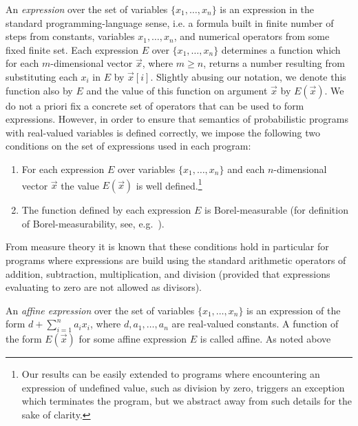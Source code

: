 \smallskip{}
An \emph{expression} over the set of variables $\{x_1,\dots,x_n\}$ 
is an expression in the standard programming-language sense, i.e. a formula 
built in finite number of steps from constants, variables $x_1,\dots,x_n$, and 
numerical operators from some fixed finite set. Each expression $E$ over 
$\{x_1,\dots,x_n\}$ 
determines a function which for each $m$-dimensional vector $\vec{x}$, where 
$m\geq n$,  
returns a number resulting from substituting each $x_i$ in $E$ by $\vec{x}[i]$. 
Slightly abusing our notation, we denote this function also by $E$ and the 
value of this function on argument $\vec{x}$ by $E(\vec{x})$. We do not a priori fix a concrete set of operators that can be used to form expressions. However, in order to ensure that semantics of probabilistic programs with real-valued variables is defined correctly, we impose the following two conditions on the set of expressions used in each program:
\begin{enumerate}
\item
For each expression $E$ over variables $\{x_1,\dots,x_n\}$ and each $n$-dimensional vector $\vec{x}$ the value $E(\vec{x})$ is well defined.\footnote{Our results can be easily extended to programs where encountering an expression of undefined value, such as division by zero, triggers an exception which terminates the program, but we abstract away from such details for the sake of clarity.}
\item
The function defined by each expression $E$ is Borel-measurable (for definition of Borel-measura\-bility, see, e.g.~\cite{Billingsley:book}).
\end{enumerate}

From measure theory it is known that these conditions hold in particular for programs where expressions are build using the standard arithmetic operators of addition, subtraction, multiplication, and division (provided that expressions evaluating to zero are not allowed as divisors).


\smallskip{}
An \emph{affine expression} over the set of variables $\{x_1,\dots,x_n\}$ is an 
expression of the form $d+\sum_{i=1}^{n}a_i
x_i$, where  $d,a_1,\dots,a_n$ are real-valued
constants.  A function of the form $E(\vec{x})$ for some affine expression $E$ 
is called affine. As noted above

